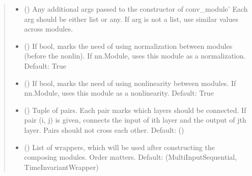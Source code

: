 \documentclass[letterpaper,10pt,english]{sphinxmanual}
\begin{document}
\begin{fulllineitems}
\begin{quote}
\begin{description}
\begin{itemize}
\item {} 
 () \textendash{} Any additional args passed to the constructor of {\color{red}\bfseries{}\textasciigrave{}}conv\_module’
Each arg should be either list or any. If arg is not a list, use similar values across modules.

\item {} 
 (\sphinxstyleliteralemphasis{\sphinxupquote{, }}) \textendash{} If bool, marks the need of using normalization between modules (before the nonlin).
If nn.Module, uses this module as a normalization.
Default: True

\item {} 
 (\sphinxstyleliteralemphasis{\sphinxupquote{, }}) \textendash{} If bool, marks the need of using nonlinearity between modules.
If nn.Module, uses this module as a nonlinearity.
Default: True

\item {} 
 () \textendash{} Tuple of pairs. Each pair marks which layers should be connected.
If pair (i, j) is given, connects the input of i\sphinxhyphen{}th layer and the output of j\sphinxhyphen{}th layer.
Pairs should not cross each other.
Default: ()

\item {} 
 (\sphinxstyleliteralemphasis{\sphinxupquote{, }}) \textendash{} List of wrappers, which will be used after constructing the composing modules. Order matters.
Default: (MultiInputSequential, TimeInvariantWrapper)


\end{itemize}
\end{description}
\end{quote}
\end{fulllineitems}
\end{document}
